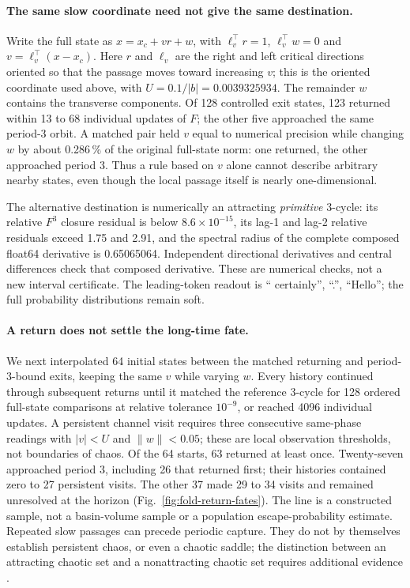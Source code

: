 \documentclass[11pt,letterpaper]{article}
\begin{document}
\paragraph{The same slow coordinate need not give the same destination.}
Write the full state as $x=x_c+v r+w$, with $\ell_v^\top r=1$, $\ell_v^\top w=0$ and
$v=\ell_v^\top(x-x_c)$. Here $r$ and $\ell_v$ are the right and left critical directions oriented so that the
passage moves toward increasing $v$; this is the oriented coordinate used above, with
$U=0.1/|b|=0.0039325934$. The remainder $w$ contains the transverse components. Of 128 controlled exit states,
123 returned within 13 to 68 individual updates of $F$; the other five approached the same period-3 orbit.
A matched pair held $v$ equal to numerical precision while changing $w$ by about 0.286\,\% of the original full-state
norm: one returned, the other approached period 3. Thus a rule based on $v$ alone cannot describe arbitrary nearby
states, even though the local passage itself is nearly one-dimensional.

The alternative destination is numerically an attracting \emph{primitive} 3-cycle: its relative $F^3$ closure
residual is below $8.6\times10^{-15}$, its lag-1 and lag-2 relative residuals exceed 1.75 and 2.91, and the spectral
radius of the complete composed float64 derivative is 0.65065064. Independent directional derivatives and central
differences check that composed derivative. These are numerical checks, not a new interval certificate. The
leading-token readout is `` certainly'', ``.'', ``Hello''; the full probability distributions remain soft.

\paragraph{A return does not settle the long-time fate.}
We next interpolated 64 initial states between the matched returning and period-3-bound exits, keeping the same
$v$ while varying $w$. Every history continued through subsequent returns until it matched the reference 3-cycle
for 128 ordered full-state comparisons at relative tolerance $10^{-9}$, or reached 4096 individual updates.
A persistent channel visit requires three consecutive same-phase readings with $|v|<U$ and $\|w\|<0.05$;
these are local observation thresholds, not boundaries of chaos. Of the 64 starts, 63 returned at least once.
Twenty-seven approached period 3, including 26 that returned first; their histories contained zero to 27 persistent
visits. The other 37 made 29 to 34 visits and remained unresolved at the horizon
(Fig.~\ref{fig:fold-return-fates}). The line is a constructed sample, not a basin-volume sample or a population
escape-probability estimate. Repeated slow passages can precede periodic capture. They do not by themselves establish
persistent chaos, or even a chaotic saddle; the distinction between an attracting chaotic set and a nonattracting
chaotic set requires additional evidence \cite{lai2011transient}.
\end{document}
